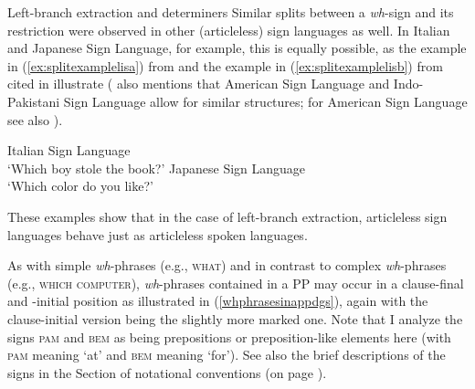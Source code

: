 \begin{digression}{Left-branch extraction and determiners}{}
Similar splits between a \textit{wh}-sign and its restriction were observed in other (articleless) sign languages as well. In Italian and Japanese Sign Language, for example, this is equally possible, as the example in (\ref{ex:splitexamplelisa}) from \citet[285]{cecchetto2009another} and the example in (\ref{ex:splitexamplelisb}) from \citet{fischer1998feature} cited in \citet[25]{zeshan2004interrogative} illustrate (\citealt{zeshan2004interrogative} also mentions that American Sign Language and Indo-Pakistani Sign Language allow for similar structures; for American Sign Language see also \citealt{boster1996quantifier}).

\begin{exe}
\ex\label{splitexamplelis}\begin{xlist}
\ex Italian Sign Language \\ 
\glt `Which boy stole the book?' \label{ex:splitexamplelisa}
\ex Japanese Sign Language \\  
\glt `Which color do you like?' \label{ex:splitexamplelisb}
\end{xlist}
\end{exe}

\noindent These examples show that in the case of left-branch extraction, articleless sign languages behave just as articleless spoken languages.
\end{digression}

\clearpage
\noindent As with simple \textit{wh}-phrases (e.g., \textsc{what}) and in contrast to complex \textit{wh}-phrases (e.g., \textsc{which computer}), \textit{wh}-phrases contained in a PP may occur in a clause-final and -initial position as illustrated in (\ref{whphrasesinappdgs}), again with the clause-initial version being the slightly more marked one. Note that I analyze the signs \textsc{pam} and \textsc{bem} as being prepositions or preposition-like elements here (with \textsc{pam} meaning `at' and \textsc{bem} meaning `for'). See also the brief descriptions of the signs in the Section of notational conventions (on page \pageref{notational}).



